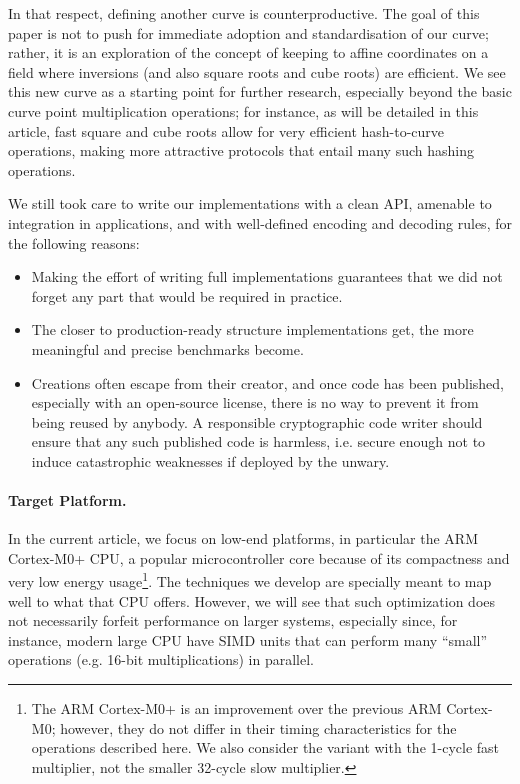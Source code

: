 \documentclass{llncs}
\begin{document}
In that respect, defining another curve is counterproductive. The goal
of this paper is not to push for immediate adoption and standardisation
of our curve; rather, it is an exploration of the concept of keeping to
affine coordinates on a field where inversions (and also square roots
and cube roots) are efficient. We see this new curve as a starting point
for further research, especially beyond the basic curve point
multiplication operations; for instance, as will be detailed in this
article, fast square and cube roots allow for very efficient
hash-to-curve operations, making more attractive protocols that entail
many such hashing operations.

We still took care to write our implementations with a clean API,
amenable to integration in applications, and with well-defined encoding
and decoding rules, for the following reasons:
\begin{itemize}

    \item Making the effort of writing full implementations guarantees
    that we did not forget any part that would be required in practice.

    \item The closer to production-ready structure implementations get,
    the more meaningful and precise benchmarks become.

    \item Creations often escape from their creator, and once code has
    been published, especially with an open-source license, there is no
    way to prevent it from being reused by anybody. A responsible
    cryptographic code writer should ensure that any such published code
    is harmless, i.e. secure enough not to induce catastrophic
    weaknesses if deployed by the unwary.

\end{itemize}

\paragraph{Target Platform.}

In the current article, we focus on low-end platforms, in particular the
ARM Cortex-M0+ CPU, a popular microcontroller core because of its
compactness and very low energy usage\footnote{The ARM Cortex-M0+ is an
improvement over the previous ARM Cortex-M0; however, they do not differ
in their timing characteristics for the operations described here. We
also consider the variant with the 1-cycle fast multiplier, not the
smaller 32-cycle slow multiplier.}. The techniques we develop are
specially meant to map well to what that CPU offers. However, we will
see that such optimization does not necessarily forfeit performance on
larger systems, especially since, for instance, modern large CPU have
SIMD units that can perform many ``small'' operations (e.g. 16-bit
multiplications) in parallel.
\end{document}
